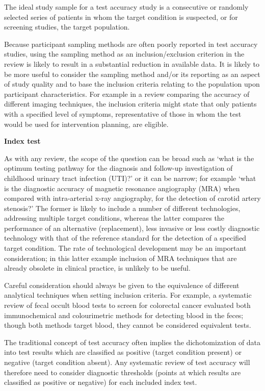 \documentclass[
  11pt,
  a4paper,
  DIV=11,
  numbers=noendperiod]{scrreprt}
\begin{document}
The ideal study sample for a test accuracy study is a consecutive or
randomly selected series of patients in whom the target condition is
suspected, or for screening studies, the target population.

Because participant sampling methods are often poorly reported in test
accuracy studies, using the sampling method as an inclusion/exclusion
criterion in the review is likely to result in a substantial reduction
in available data. It is likely to be more useful to consider the
sampling method and/or its reporting as an aspect of study quality and
to base the inclusion criteria relating to the population upon
participant characteristics. For example in a review comparing the
accuracy of different imaging techniques, the inclusion criteria might
state that only patients with a specified level of symptoms,
representative of those in whom the test would be used for intervention
planning, are eligible.

\textbf{Index test}

As with any review, the scope of the question can be broad such as `what
is the optimum testing pathway for the diagnosis and follow-up
investigation of childhood urinary tract infection (UTI)?' or it can be
narrow; for example `what is the diagnostic accuracy of magnetic
resonance angiography (MRA) when compared with intra-arterial x-ray
angiography, for the detection of carotid artery stenosis?' The former
is likely to include a number of different technologies, addressing
multiple target conditions, whereas the latter compares the performance
of an alternative (replacement), less invasive or less costly diagnostic
technology with that of the reference standard for the detection of a
specified target condition. The rate of technological development may be
an important consideration; in this latter example inclusion of MRA
techniques that are already obsolete in clinical practice, is unlikely
to be useful.

Careful consideration should always be given to the equivalence of
different analytical techniques when setting inclusion criteria. For
example, a systematic review of fecal occult blood tests to screen for
colorectal cancer evaluated both immunochemical and colourimetric
methods for detecting blood in the feces; though both methods target
blood, they cannot be considered equivalent tests.

The traditional concept of test accuracy often implies the
dichotomization of data into test results which are classified as
positive (target condition present) or negative (target condition
absent). Any systematic review of test accuracy will therefore need to
consider diagnostic thresholds (points at which results are classified
as positive or negative) for each included index test.
\end{document}
